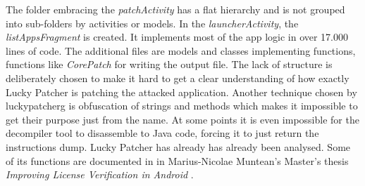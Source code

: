 The folder embracing the \textit{patchActivity} has a flat hierarchy and is not grouped into sub-folders by activities or models.
In the \textit{launcherActivity}, the \textit{listAppsFragment} is created.
It implements most of the app logic in over 17.000 lines of code.
The additional files are models and classes implementing functions, functions like \textit{CorePatch} for writing the output file.
The lack of structure is deliberately chosen to make it hard to get a clear understanding of how exactly Lucky Patcher is patching the attacked application.
Another technique chosen by \gls{luckypatcherg} is obfuscation of strings and methods which makes it impossible to get their purpose just from the name.
At some points it is even impossible for the decompiler tool to disassemble to Java code, forcing it to just return the instructions dump.
\newline
Lucky Patcher has already has already been analysed.
Some of its functions are documented in in Marius-Nicolae Muntean's Master's thesis \textit{Improving License Verification in Android} \cite{munteanLicense}.
